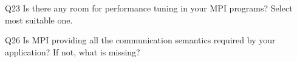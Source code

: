 \begin{description}%
\item{Q23} Is there any room for performance tuning in your MPI programs? Select most suitable one.%
\item{Q26} Is MPI providing all the communication semantics required by your application? If not, what is missing?%
\end{description}%
